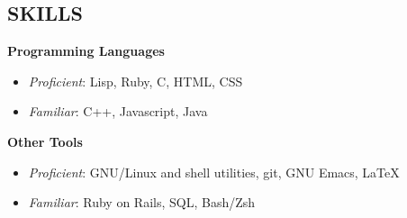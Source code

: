 \documentclass[line,margin]{res}
\begin{document}
\begin{resume}


  \section{SKILLS}
  {\bf\rmfamily Programming Languages}
  \begin{itemize} \itemsep -2pt
  \item \emph{Proficient}: Lisp, Ruby, C, HTML, CSS
  \item \emph{Familiar}: C++, Javascript, Java
  \end{itemize}

  {\bf\rmfamily Other Tools}
  \begin{itemize} \itemsep -2pt
  \item \emph{Proficient}: GNU/Linux and shell utilities, git, GNU Emacs, \LaTeX
  \item \emph{Familiar}: Ruby on Rails, SQL, Bash/Zsh
  \end{itemize}







\end{resume}
\end{document}
